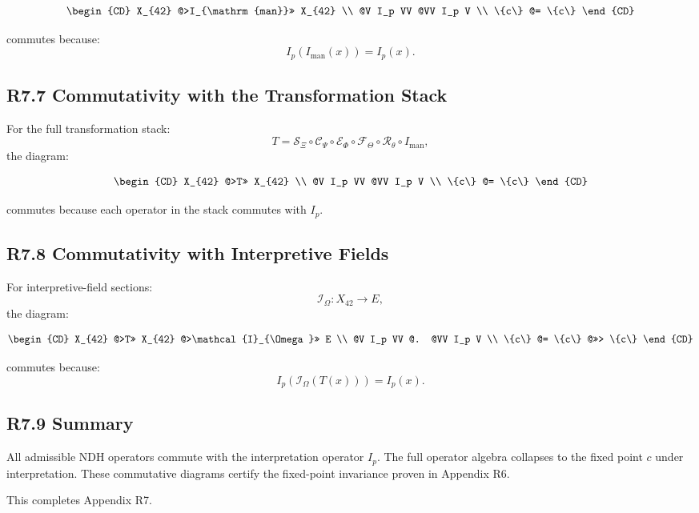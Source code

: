 \[
\begin{CD}
X_{42} @>I_{\mathrm{man}}>> X_{42} \\
@V I_p VV @VV I_p V \\
\{c\} @= \{c\}
\end{CD}
\]

commutes because:
\[
I_p(I_{\mathrm{man}}(x)) = I_p(x).
\]

\subsection*{R7.7 Commutativity with the Transformation Stack}

For the full transformation stack:
\[
T = 
\mathcal{S}_{\Xi} \circ
\mathcal{C}_{\Psi} \circ
\mathcal{E}_{\Phi} \circ
\mathcal{F}_{\Theta} \circ
\mathcal{R}_{\theta} \circ
I_{\mathrm{man}},
\]
the diagram:

\[
\begin{CD}
X_{42} @>T>> X_{42} \\
@V I_p VV @VV I_p V \\
\{c\} @= \{c\}
\end{CD}
\]

commutes because each operator in the stack commutes with $I_p$.

\subsection*{R7.8 Commutativity with Interpretive Fields}

For interpretive-field sections:
\[
\mathcal{I}_{\Omega} : X_{42} \to E,
\]
the diagram:

\[
\begin{CD}
X_{42} @>T>> X_{42} @>\mathcal{I}_{\Omega}>> E \\
@V I_p VV @. @VV I_p V \\
\{c\} @= \{c\} @>>> \{c\}
\end{CD}
\]

commutes because:
\[
I_p(\mathcal{I}_{\Omega}(T(x))) = I_p(x).
\]

\subsection*{R7.9 Summary}

All admissible NDH operators commute with the interpretation operator
$I_p$. The full operator algebra collapses to the fixed point $c$ under
interpretation. These commutative diagrams certify the fixed-point
invariance proven in Appendix R6.

This completes Appendix R7.
